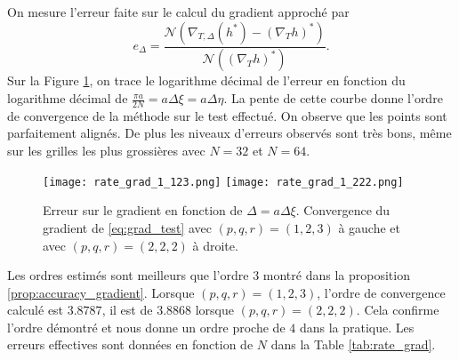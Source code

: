 On mesure l'erreur faite sur le calcul du gradient approché par
\begin{equation}
e_{\Delta} = \dfrac{\mathcal{N}\left(\nabla_{T,\Delta}(h^*) - \left( \nabla_{T}h \right)^* \right)}{\mathcal{N}\left(\left( \nabla_{T}h \right)^* \right)}.
\end{equation}
Sur la Figure \ref{fig:rate_grad}, on trace le logarithme décimal de l'erreur en fonction du logarithme décimal de $\frac{\pi a}{2 N} = a \Delta \xi = a \Delta \eta$. La pente de cette courbe donne l'ordre de convergence de la méthode sur le test effectué. On observe que les points sont parfaitement alignés. De plus les niveaux d'erreurs observés sont très bons, même sur les grilles les plus grossières avec $N=32$ et $N=64$.

\begin{figure}[htbp]
\begin{center}
\texttt{[image: rate\_grad\_1\_123.png]}
\texttt{[image: rate\_grad\_1\_222.png]}
\end{center}
\caption{Erreur sur le gradient en fonction de $\Delta = a\Delta \xi$. Convergence du gradient de \eqref{eq:grad_test} avec $(p,q,r)=(1,2,3)$ à gauche et avec $(p,q,r)=(2,2,2)$ à droite.}
\label{fig:rate_grad}
\end{figure}

Les ordres estimés sont meilleurs que l'ordre 3 montré dans la proposition \ref{prop:accuracy_gradient}. Lorsque $(p,q,r)=(1,2,3)$, l'ordre de convergence calculé est $3.8787$, il est de $3.8868$ lorsque $(p,q,r)=(2,2,2)$. Cela confirme l'ordre démontré et nous donne un ordre proche de $4$ dans la pratique. Les erreurs effectives sont données en fonction de $N$ dans la Table \ref{tab:rate_grad}.

